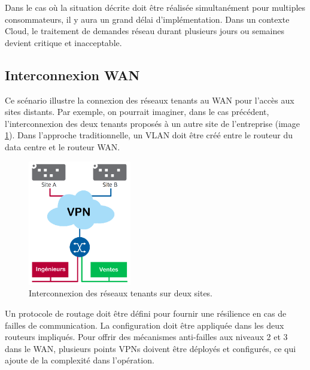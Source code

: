 Dans le cas où la situation décrite doit être réalisée simultanément pour multiples consommateurs, il y aura un grand délai d'implémentation. Dans un contexte Cloud, le traitement de demandes réseau durant plusieurs jours ou semaines devient critique et inacceptable.  \cite{hpCloudEffectsOnNetworkLimitations} \cite{leveragingSDNCloudNetworkServiceExample} \cite{zkCloudArrived}


\subsection*{Interconnexion WAN}

Ce scénario illustre la connexion des réseaux tenants au WAN pour l'accès aux sites distants. Par exemple, on pourrait imaginer, dans le cas précédent, l'interconnexion des deux tenants proposés à un autre site de l'entreprise (image \ref{InterconnexionWAN}). Dans l'approche traditionnelle, un VLAN doit être créé entre le routeur du data centre et le routeur WAN.



\begin{figure}[h]
\begin{center}
\includegraphics[width=0.4\textwidth]{images/InterconnexionWAN_T} 
\caption{Interconnexion des réseaux tenants sur deux sites. \cite{leveragingSDNCloudDCWAN}} \label{InterconnexionWAN}
\end{center}
\end{figure} 



Un protocole de routage doit être défini pour fournir une résilience en cas de failles de communication. La configuration doit être appliquée dans les deux routeurs impliqués. Pour offrir des mécanismes anti-failles aux niveaux 2 et 3 dans le WAN, plusieurs points VPNs doivent être déployés et configurés, ce qui ajoute de la complexité dans l'opération.

